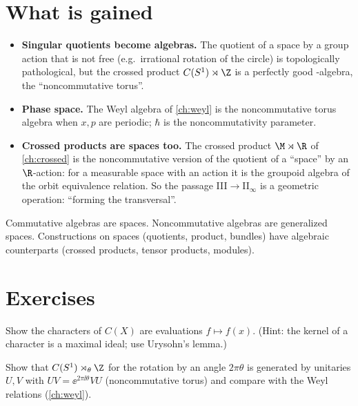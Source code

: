 \section{What is gained}
\begin{itemize}
\item \textbf{Singular quotients become algebras.} The quotient of a space by a group action that is not free (e.g.\ irrational rotation of the circle) is topologically pathological, but the crossed product $C(S^1)\rtimes\Z$ is a perfectly good \cstar-algebra, the ``noncommutative torus''.
\item \textbf{Phase space.} The Weyl algebra of \cref{ch:weyl} is the noncommutative torus algebra when $x,p$ are periodic; $\hbar$ is the noncommutativity parameter.
\item \textbf{Crossed products are spaces too.} The crossed product $\M\rtimes\R$ of \cref{ch:crossed} is the noncommutative version of the quotient of a ``space'' by an $\R$-action: for a measurable space with an action it is the groupoid algebra of the orbit equivalence relation. So the passage III$\to$II$_\infty$ is a geometric operation: ``forming the transversal''.
\end{itemize}

\begin{keyidea}
Commutative algebras are spaces. Noncommutative algebras are generalized spaces. Constructions on spaces (quotients, product, bundles) have algebraic counterparts (crossed products, tensor products, modules).
\end{keyidea}

\section*{Exercises}
\begin{exercise}
Show the characters of $C(X)$ are evaluations $f\mapsto f(x)$. (Hint: the kernel of a character is a maximal ideal; use Urysohn's lemma.)
\end{exercise}
\begin{exercise}
Show that $C(S^1)\rtimes_\theta\Z$ for the rotation by an angle $2\pi\theta$ is generated by unitaries $U,V$ with $UV=\ee^{2\pi\ii\theta}VU$ (noncommutative torus) and compare with the Weyl relations (\cref{ch:weyl}).
\end{exercise}
